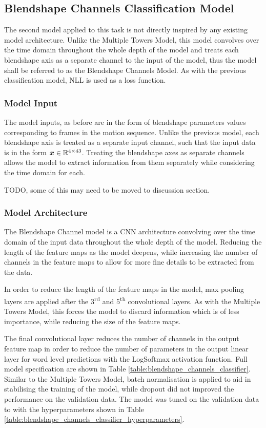 \subsection{Blendshape Channels Classification Model}\label{secc:blendshape_channels_model}
The second model applied to this task is not directly inspired by any existing model architecture.
Unlike the Multiple Towers Model, this model convolves over the time domain throughout the whole depth of the model and treats each blendshape axis as a separate channel to the input of the model, thus the model shall be referred to as the Blendshape Channels Model.
As with the previous classification model, NLL is used as a loss function.

\subsubsection{Model Input}
The model inputs, as before are in the form of blendshape parameters values corresponding to frames in the motion sequence.
Unlike the previous model, each blendshape axis is treated as a separate input channel, such that the input data is in the form ${\boldsymbol{{x}}} \in \mathbb{R}^{4 \times 43}$.
Treating the blendshape axes as separate channels allows the model to extract information from them separately while considering the time domain for each.

TODO, some of this may need to be moved to discussion section.

\subsubsection{Model Architecture}
The Blendshape Channel model is a CNN architecture convolving over the time domain of the input data throughout the whole depth of the model.
Reducing the length of the feature maps as the model deepens, while increasing the number of channels in the feature maps to allow for more fine details to be extracted from the data.

In order to reduce the length of the feature maps in the model, max pooling layers are applied after the 3\textsuperscript{rd} and 5\textsuperscript{th} convolutional layers.
As with the Multiple Towers Model, this forces the model to discard information which is of less importance, while reducing the size of the feature maps.

The final convolutional layer reduces the number of channels in the output feature map in order to reduce the number of parameters in the output linear layer for word level predictions with the LogSoftmax activation function.
Full model specification are shown in Table \ref{table:blendshape_channels_classifier}.
Similar to the Multiple Towers Model, batch normalisation is applied to aid in stabilising the training of the model, while dropout did not improved the performance on the validation data.
The model was tuned on the validation data to with the hyperparameters shown in Table \ref{table:blendshape_channels_classifier_hyperparameters}.

